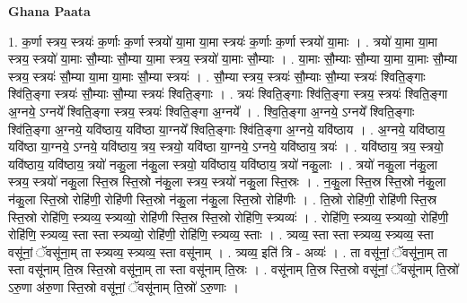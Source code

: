 \documentclass[17pt]{extarticle}
\begin{document}
\textbf{Ghana Paata } \newline

1. क॒र्णा स्त्रय॒ स्त्रयः॑ क॒र्णाः क॒र्णा स्त्रयो॑ या॒मा या॒मा स्त्रयः॑ क॒र्णाः क॒र्णा स्त्रयो॑ या॒माः । . त्रयो॑ या॒मा या॒मा स्त्रय॒ स्त्रयो॑ या॒माः सौ॒म्याः सौ॒म्या या॒मा स्त्रय॒ स्त्रयो॑ या॒माः सौ॒म्याः । . या॒माः सौ॒म्याः सौ॒म्या या॒मा या॒माः सौ॒म्या स्त्रय॒ स्त्रयः॑ सौ॒म्या या॒मा या॒माः सौ॒म्या स्त्रयः॑ । . सौ॒म्या स्त्रय॒ स्त्रयः॑ सौ॒म्याः सौ॒म्या स्त्रयः॑ श्विति॒ङ्गाः श्वि॑ति॒ङ्गा स्त्रयः॑ सौ॒म्याः सौ॒म्या स्त्रयः॑ श्विति॒ङ्गाः । . त्रयः॑ श्विति॒ङ्गाः श्वि॑ति॒ङ्गा स्त्रय॒ स्त्रयः॑ श्विति॒ङ्गा अ॒ग्नये॒ ऽग्नये᳚ श्विति॒ङ्गा स्त्रय॒ स्त्रयः॑ श्विति॒ङ्गा अ॒ग्नये᳚ । . श्वि॒ति॒ङ्गा अ॒ग्नये॒ ऽग्नये᳚ श्विति॒ङ्गाः श्वि॑ति॒ङ्गा अ॒ग्नये॒ यवि॑ष्ठाय॒ यवि॑ष्ठा या॒ग्नये᳚ श्विति॒ङ्गाः श्वि॑ति॒ङ्गा अ॒ग्नये॒ यवि॑ष्ठाय । . अ॒ग्नये॒ यवि॑ष्ठाय॒ यवि॑ष्ठा या॒ग्नये॒ ऽग्नये॒ यवि॑ष्ठाय॒ त्रय॒ स्त्रयो॒ यवि॑ष्ठा या॒ग्नये॒ ऽग्नये॒ यवि॑ष्ठाय॒ त्रयः॑ । . यवि॑ष्ठाय॒ त्रय॒ स्त्रयो॒ यवि॑ष्ठाय॒ यवि॑ष्ठाय॒ त्रयो॑ नकु॒ला न॑कु॒ला स्त्रयो॒ यवि॑ष्ठाय॒ यवि॑ष्ठाय॒ त्रयो॑ नकु॒लाः । . त्रयो॑ नकु॒ला न॑कु॒ला स्त्रय॒ स्त्रयो॑ नकु॒ला स्ति॒स्र स्ति॒स्रो न॑कु॒ला स्त्रय॒ स्त्रयो॑ नकु॒ला स्ति॒स्रः । . न॒कु॒ला स्ति॒स्र स्ति॒स्रो न॑कु॒ला न॑कु॒ला स्ति॒स्रो रोहि॑णी॒ रोहि॑णी स्ति॒स्रो न॑कु॒ला न॑कु॒ला स्ति॒स्रो रोहि॑णीः । . ति॒स्रो रोहि॑णी॒ रोहि॑णी स्ति॒स्र स्ति॒स्रो रोहि॑णि॒ स्त्र्यव्य॒ स्त्र्यव्यो॒ रोहि॑णी स्ति॒स्र स्ति॒स्रो रोहि॑णि॒ स्त्र्यव्यः॑ । . रोहि॑णि॒ स्त्र्यव्य॒ स्त्र्यव्यो॒ रोहि॑णी॒ रोहि॑णि॒ स्त्र्यव्य॒ स्ता स्ता स्त्र्यव्यो॒ रोहि॑णी॒ रोहि॑णि॒ स्त्र्यव्य॒ स्ताः । . त्र्यव्य॒ स्ता स्ता स्त्र्यव्य॒ स्त्र्यव्य॒ स्ता वसू॑नां॒ ॅवसू॑ना॒म् ता स्त्र्यव्य॒ स्त्र्यव्य॒ स्ता वसू॑नाम् । . त्र्यव्य॒ इति॑ त्रि - अव्यः॑ । . ता वसू॑नां॒ ॅवसू॑ना॒म् ता स्ता वसू॑नाम् ति॒स्र स्ति॒स्रो वसू॑ना॒म् ता स्ता वसू॑नाम् ति॒स्रः । . वसू॑नाम् ति॒स्र स्ति॒स्रो वसू॑नां॒ ॅवसू॑नाम् ति॒स्रो॑ ऽरु॒णा अ॑रु॒णा स्ति॒स्रो वसू॑नां॒ ॅवसू॑नाम् ति॒स्रो॑ ऽरु॒णाः । \newline
\end{document}
